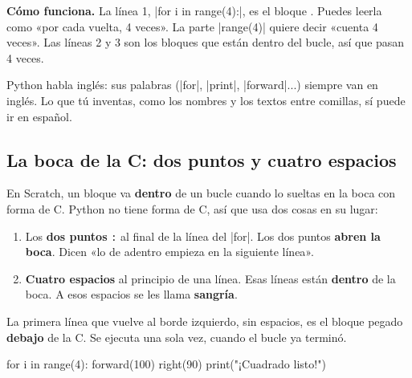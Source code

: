 \textbf{Cómo funciona.} La línea 1, \py|for i in range(4):|, es el bloque . Puedes leerla como «por cada vuelta, 4 veces». La parte \py|range(4)| quiere decir «cuenta 4 veces». Las líneas 2 y 3 son los bloques que están dentro del bucle, así que pasan 4 veces.

Python habla inglés: sus palabras (\py|for|, \py|print|, \py|forward|...) siempre van en inglés. Lo que tú inventas, como los nombres y los textos entre comillas, sí puede ir en español.

\subsection*{La boca de la C: dos puntos y cuatro espacios}

En Scratch, un bloque va \textbf{dentro} de un bucle cuando lo sueltas en la boca con forma de C. Python no tiene forma de C, así que usa dos cosas en su lugar:

\begin{enumerate}
  \item Los \textbf{dos puntos} \texttt{:} al final de la línea del \py|for|. Los dos puntos \textbf{abren la boca}. Dicen «lo de adentro empieza en la siguiente línea».
  \item \textbf{Cuatro espacios} al principio de una línea. Esas líneas están \textbf{dentro} de la boca. A esos espacios se les llama \textbf{sangría}.
\end{enumerate}

La primera línea que vuelve al borde izquierdo, sin espacios, es el bloque pegado \textbf{debajo} de la C. Se ejecuta una sola vez, cuando el bucle ya terminó.

\begin{tcbraster}[raster columns=2, raster equal height=rows, raster column skip=12pt, raster valign=center]
\begin{tcolorbox}[colback=white, colframe=white, boxrule=0pt, valign=center]
\begin{scratch}[scale=0.85]
\end{scratch}
\end{tcolorbox}
\begin{spaces}
for i in range(4):
    forward(100)
    right(90)
print("¡Cuadrado listo!")
\end{spaces}
\end{tcbraster}

